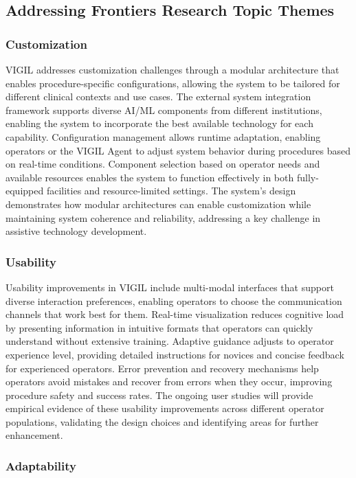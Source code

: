 \documentclass[12pt,a4paper]{article}
\begin{document}
\subsection{Addressing Frontiers Research Topic Themes}

\subsubsection{Customization}

VIGIL addresses customization challenges through a modular architecture that enables procedure-specific configurations, allowing the system to be tailored for different clinical contexts and use cases. The external system integration framework supports diverse AI/ML components from different institutions, enabling the system to incorporate the best available technology for each capability. Configuration management allows runtime adaptation, enabling operators or the VIGIL Agent to adjust system behavior during procedures based on real-time conditions. Component selection based on operator needs and available resources enables the system to function effectively in both fully-equipped facilities and resource-limited settings. The system's design demonstrates how modular architectures can enable customization while maintaining system coherence and reliability, addressing a key challenge in assistive technology development.

\subsubsection{Usability}

Usability improvements in VIGIL include multi-modal interfaces that support diverse interaction preferences, enabling operators to choose the communication channels that work best for them. Real-time visualization reduces cognitive load by presenting information in intuitive formats that operators can quickly understand without extensive training. Adaptive guidance adjusts to operator experience level, providing detailed instructions for novices and concise feedback for experienced operators. Error prevention and recovery mechanisms help operators avoid mistakes and recover from errors when they occur, improving procedure safety and success rates. The ongoing user studies will provide empirical evidence of these usability improvements across different operator populations, validating the design choices and identifying areas for further enhancement.

\subsubsection{Adaptability}
\end{document}
